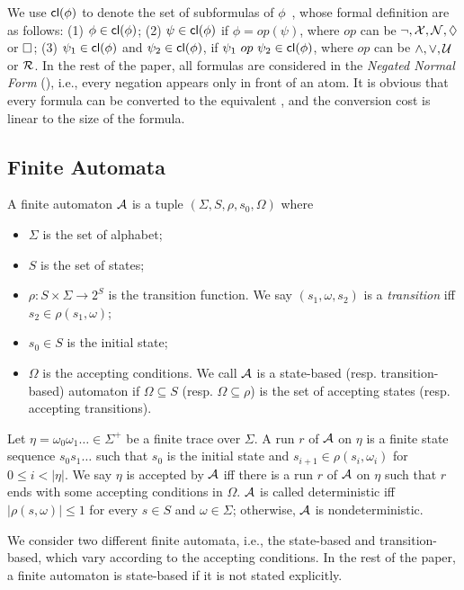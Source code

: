 We use ${\sf cl}(\phi)$ to denote the set of subformulas of $\phi$~\cite{Wol81}, whose formal definition are as follows: (1) $\phi\in{\sf cl}(\phi)$; (2) $\psi\in{\sf cl}(\phi)$ if $\phi=op(\psi)$, where $op$ can be $\neg,\mathcal{X},\mathcal{N},\Diamond$ or $\Box$; (3) $\psi_1\in{\sf cl}(\phi)$ and $\psi_2\in{\sf cl}(\phi)$, if $\psi_1\ op\ \psi_2\in{\sf cl}(\phi)$, where $op$ can be $\wedge,\vee,\mathcal{U}$ or $\mathcal{R}$. In the rest of the paper, all \ltlf formulas are considered in the \emph{Negated Normal Form} (\NNF), i.e., every negation appears only in front of an atom. It is obvious that every \ltlf formula can be converted to the equivalent \NNF, and the conversion cost is linear to the size of the formula.

\subsection{Finite Automata}
\noindent A finite automaton $\mathcal{A}$ is a tuple $(\Sigma, S, \rho, s_0, \Omega)$ where 
\begin{itemize}
	\item $\Sigma$ is the set of alphabet;
	\item $S$ is the set of states;
	\item $\rho: S\times\Sigma \rightarrow 2^S$ is the transition function. We say $(s_1,\omega, s_2)$ is a \emph{transition} iff $s_2\in\rho(s_1,\omega)$;
	\item $s_0\in S$ is the initial state;
	\item $\Omega$ is the accepting conditions. We call $\mathcal{A}$ is a state-based (resp. transition-based) automaton if $\Omega\subseteq S$ (resp. $\Omega\subseteq \rho$) is the set of accepting states (resp. accepting transitions).
\end{itemize}
Let $\eta=\omega_0\omega_1\ldots\in\Sigma^+$ be a finite trace over $\Sigma$. A run $r$ of $\mathcal{A}$ on $\eta$ is a finite state sequence $s_0 s_1\ldots$ such that $s_0$ is the initial state and $s_{i+1}\in\rho(s_i,\omega_i)$ for $0\leq i < |\eta|$. We say $\eta$ is accepted by $\mathcal{A}$ iff there is a run $r$ of $\mathcal{A}$ on $\eta$ such that $r$ ends with some accepting conditions in $\Omega$. $\mathcal{A}$ is called deterministic iff $|\rho(s,\omega)| \leq 1$ for every $s\in S$ and $\omega\in\Sigma$; otherwise, $\mathcal{A}$ is nondeterministic. 

We consider two different finite automata, i.e., the state-based and transition-based, which vary according to the accepting conditions. In the rest of the paper, a finite automaton is state-based if it is not stated explicitly.  

